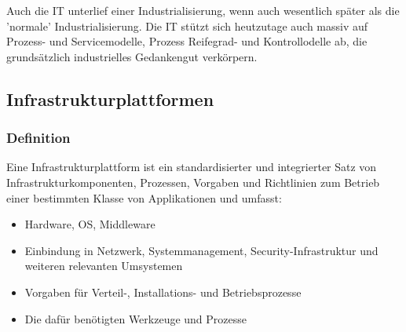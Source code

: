 \documentclass[a4paper, 11pt]{article}
\begin{document}
Auch die IT unterlief einer Industrialisierung, wenn auch wesentlich später als die 'normale' Industrialisierung. Die IT stützt sich heutzutage auch massiv auf Prozess- und Servicemodelle, Prozess Reifegrad- und Kontrollodelle ab, die grundsätzlich industrielles Gedankengut verkörpern.                                                                                                                                                                                       

\subsection{Infrastrukturplattformen}
\subsubsection{Definition}
Eine Infrastrukturplattform ist ein standardisierter und integrierter Satz von Infrastrukturkomponenten, Prozessen, Vorgaben und Richtlinien zum Betrieb einer bestimmten Klasse von Applikationen und umfasst:

\begin{itemize}
	\item Hardware, OS, Middleware
	\item Einbindung in Netzwerk, Systemmanagement, Security-Infrastruktur und weiteren relevanten Umsystemen
	\item Vorgaben für Verteil-, Installations- und Betriebsprozesse
	\item Die dafür benötigten Werkzeuge und Prozesse
\end{itemize}

\newpage
\end{document}

